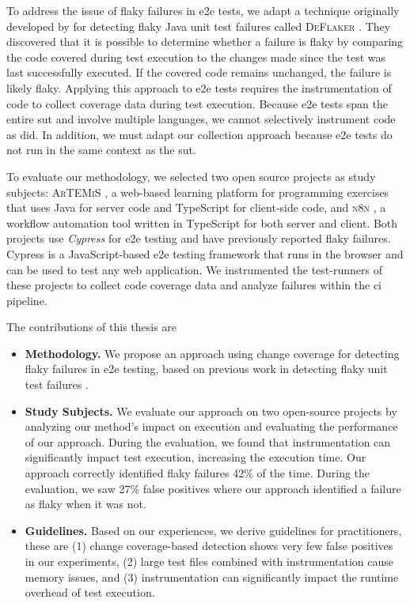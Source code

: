 To address the issue of flaky failures in \ac{e2e} tests, we adapt a technique originally developed by \citeauthor*{bell_deflaker_2018} for detecting flaky Java unit test failures called \textsc{DeFlaker} \autocite{bell_deflaker_2018}.
They discovered that it is possible to determine whether a failure is flaky by comparing the code covered during test execution to the changes made since the test was last successfully executed.
If the covered code remains unchanged, the failure is likely flaky.
Applying this approach to \ac{e2e} tests requires the instrumentation of code to collect coverage data during test execution.
Because \ac{e2e} tests span the entire \ac{sut} and involve multiple languages, we cannot selectively instrument code as \citeauthor*{bell_deflaker_2018} did.
In addition, we must adapt our collection approach because \ac{e2e} tests do not run in the same context as the \ac{sut}.

To evaluate our methodology, we selected two open source projects as study subjects:
\textsc{ArTEMiS} \autocite{krusche_artemis_2018}, a web-based learning platform for programming exercises that uses Java for server code and TypeScript for client-side code, and \textsc{n8n} \autocite{noauthor_n8n_2023}, a workflow automation tool written in TypeScript for both server and client.
Both projects use \textit{Cypress} \autocite{noauthor_cypress-iocypress_2023} for \ac{e2e} testing and have previously reported flaky failures.
Cypress is a JavaScript-based \ac{e2e} testing framework that runs in the browser and can be used to test any web application.
We instrumented the test-runners of these projects to collect code coverage data and analyze failures within the \ac{ci} pipeline.

The contributions of this thesis are
\begin{itemize}
	\item \textbf{Methodology.} We propose an approach using change coverage for detecting flaky failures in \ac{e2e} testing, based on previous work in detecting flaky unit test failures \autocite{bell_deflaker_2018}.
	\item \textbf{Study Subjects.} We evaluate our approach on two open-source projects by analyzing our method's impact on execution and evaluating the performance of our approach.
	      During the evaluation, we found that instrumentation can significantly impact test execution, increasing the execution time.
	      Our approach correctly identified flaky failures 42\% of the time.
	      During the evaluation, we saw 27\% false positives where our approach identified a failure as flaky when it was not.
	\item \textbf{Guidelines.} Based on our experiences, we derive guidelines for practitioners, these are
	      (1) change coverage-based detection shows very few false positives in our experiments,
	      (2) large test files combined with instrumentation cause memory issues, and
	      (3) instrumentation can significantly impact the runtime overhead of test execution.
\end{itemize}

